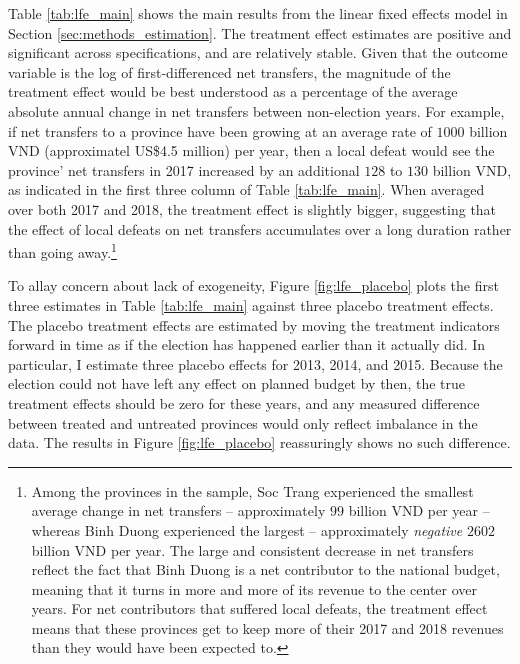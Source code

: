 \documentclass[12pt]{article}
\newcommand{\1}{\mathbbm{1}}
\begin{document}
Table \ref{tab:lfe_main} shows the main results from the linear fixed effects model in Section \ref{sec:methods_estimation}. The treatment effect estimates are positive and significant across specifications, and are relatively stable. Given that the outcome variable is the log of first-differenced net transfers, the magnitude of the treatment effect would be best understood as a percentage of the average absolute annual change in net transfers between non-election years. For example, if net transfers to a province have been growing at an average rate of $1000$ billion VND (approximatel US\$4.5 million) per year, then a local defeat would see the province' net transfers in 2017 increased by an additional $128$ to $130$ billion VND, as indicated in the first three column of Table \ref{tab:lfe_main}. When averaged over both 2017 and 2018, the treatment effect is slightly bigger, suggesting that the effect of local defeats on net transfers accumulates over a long duration rather than going away.\footnote{Among the provinces in the sample, Soc Trang experienced the smallest average change in net transfers -- approximately $99$ billion VND per year -- whereas Binh Duong experienced the largest -- approximately \textit{negative} $2602$ billion VND per year. The large and consistent decrease in net transfers reflect the fact that Binh Duong is a net contributor to the national budget, meaning that it turns in more and more of its revenue to the center over years. For net contributors that suffered local defeats, the treatment effect means that these provinces get to keep more of their 2017 and 2018 revenues than they would have been expected to.}

To allay concern about lack of exogeneity, Figure \ref{fig:lfe_placebo} plots the first three estimates in Table \ref{tab:lfe_main} against three placebo treatment effects. The placebo treatment effects are estimated by moving the treatment indicators forward in time as if the election has happened earlier than it actually did. In particular, I estimate three placebo effects for 2013, 2014, and 2015. Because the election could not have left any effect on planned budget by then, the true treatment effects should be zero for these years, and any measured difference between treated and untreated provinces would only reflect imbalance in the data. The results in Figure \ref{fig:lfe_placebo} reassuringly shows no such difference.
\end{document}
